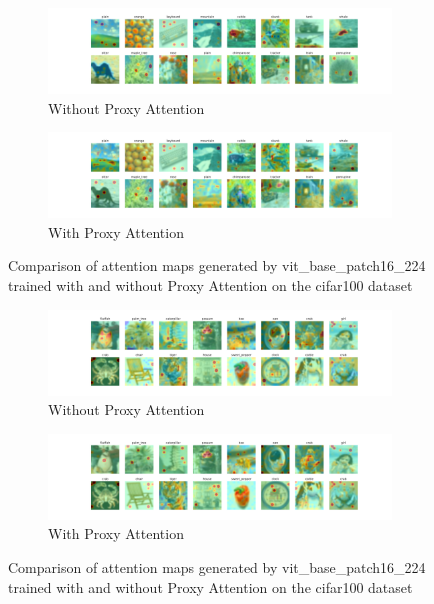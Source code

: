     \begin{figure}[H]
        \centering
        \begin{subfigure}[b]{1\textwidth}
            \includegraphics[width=\textwidth]{images/cifar100_vit_base_patch16_224_noproxy_2.pdf}
            \caption{Without Proxy Attention}
        \end{subfigure}
        \hfill
        \begin{subfigure}[b]{1\textwidth}
            \includegraphics[width=\textwidth]{images/cifar100_vit_base_patch16_224_proxy_2.pdf}
            \caption{With Proxy Attention}
        \end{subfigure}
        \caption{Comparison of attention maps generated by vit\_base\_patch16\_224 trained with and without Proxy Attention on the cifar100 dataset}
    \end{figure}
    

    \begin{figure}[H]
        \centering
        \begin{subfigure}[b]{1\textwidth}
            \includegraphics[width=\textwidth]{images/cifar100_vit_base_patch16_224_noproxy_3.pdf}
            \caption{Without Proxy Attention}
        \end{subfigure}
        \hfill
        \begin{subfigure}[b]{1\textwidth}
            \includegraphics[width=\textwidth]{images/cifar100_vit_base_patch16_224_proxy_3.pdf}
            \caption{With Proxy Attention}
        \end{subfigure}
        \caption{Comparison of attention maps generated by vit\_base\_patch16\_224 trained with and without Proxy Attention on the cifar100 dataset}
    \end{figure}
    

